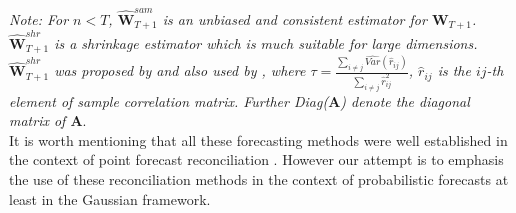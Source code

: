 \documentclass[a4paper, 11pt]{article}
\begin{document}
\begin{center}
	
	
\end{center}
\textit{Note: For $n<T$, $\bm{\hat{W}}_{T+1}^{sam}$ is an unbiased and consistent estimator for $\bm{W}_{T+1}$. $\mathbold{\hat{W}}_{T+1}^{shr}$ is a shrinkage estimator which is much suitable for large dimensions. $\mathbold{\hat{W}}_{T+1}^{shr}$ was proposed by \citet{Schafer2005} and also used by \citet{Wickramasuriya2017}, where $\tau = \frac{\sum_{i \ne j}\hat{Var}(\hat{r}_{ij})}{\sum_{i \ne j}\hat{r}_{ij}^2}$, $\hat{r}_{ij}$ is the $ij$-th element of sample correlation matrix. Further Diag($\bm{A}$) denote the diagonal matrix of $\bm{A}$}.\\

\noindent
It is worth mentioning that all these forecasting methods were well established in the context of point forecast reconciliation \citep{Hyndman2011, Wickramasuriya2017, Hyndman2016}. However our attempt is to emphasis the use of these reconciliation methods in the context of probabilistic forecasts at least in the Gaussian framework. \\
\end{document}
